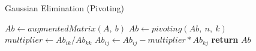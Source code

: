 \documentclass{article}
\begin{document}
  \begin{algorithm}
    \caption{Gaussian Elimination (Pivoting)}
    \begin{algorithmic}[1]
        \State $Ab \gets augmentedMatrix(A,\ b)$
          \State $Ab \gets pivoting(Ab,\ n,\ k)$
            \State $multiplier \gets Ab_{ik} / Ab_{kk}$
              \State $Ab_{ij} \gets Ab_{ij} - multiplier * Ab_{kj}$
            \EndFor
          \EndFor
        \EndFor
        \State \textbf{return} $Ab$
      \EndProcedure
    \end{algorithmic}
  \end{algorithm}
\end{document}
